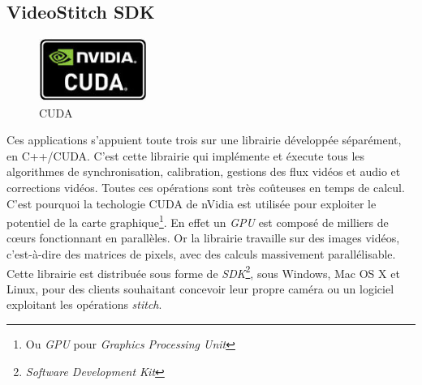 \subsection{VideoStitch SDK}
\label{videostitch-sdk-section}
\begin{figure}
  \centering
  \includegraphics[width=3.5cm]{images/cuda-logo.jpg}
  \caption{CUDA}
\end{figure}
Ces applications s'appuient toute trois sur une librairie développée séparément,
en C++/CUDA. C'est cette librairie qui implémente et éxecute tous les algorithmes
de synchronisation, calibration, gestions des flux vidéos et audio et corrections
vidéos.
Toutes ces opérations sont très coûteuses en temps de calcul. C'est pourquoi
la techologie CUDA de nVidia est utilisée pour exploiter le potentiel de la carte
graphique\footnote{Ou \textit{GPU} pour \textit{Graphics Processing Unit}}. 
En effet un \textit{GPU} est composé de milliers de c\oe urs fonctionnant en parallèles.
Or la librairie travaille sur des images vidéos, c'est-à-dire des matrices de pixels,
avec des calculs massivement parallélisable\cite{videostitch-cuda}.\\
\newline
Cette librairie est distribuée sous forme de \textit{SDK}\footnote{\textit{Software Development Kit}}, sous Windows, Mac OS X et Linux, 
pour des clients souhaitant concevoir leur propre caméra ou un logiciel exploitant
les opérations \textit{stitch}.

